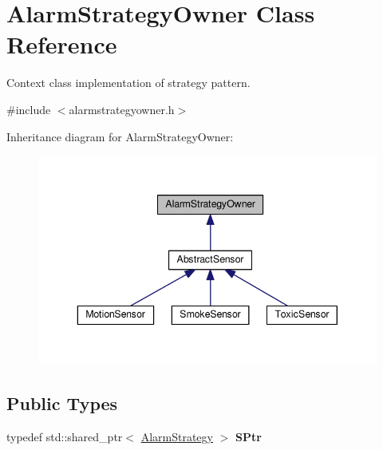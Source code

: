 \hypertarget{classAlarmStrategyOwner}{}\section{Alarm\+Strategy\+Owner Class Reference}
\label{classAlarmStrategyOwner}


Context class implementation of strategy pattern.  




{\ttfamily \#include $<$alarmstrategyowner.\+h$>$}



Inheritance diagram for Alarm\+Strategy\+Owner\+:\nopagebreak
\begin{figure}[H]
\begin{center}
\leavevmode
\includegraphics[width=343pt]{classAlarmStrategyOwner__inherit__graph}
\end{center}
\end{figure}
\subsection*{Public Types}
\begin{DoxyCompactItemize}
\item 
typedef std\+::shared\+\_\+ptr$<$ \hyperlink{classAlarmStrategy}{Alarm\+Strategy} $>$ {\bfseries S\+Ptr}\hypertarget{classAlarmStrategyOwner_aeebd31011e2a6d14a4492315ad15c5ee}{}\label{classAlarmStrategyOwner_aeebd31011e2a6d14a4492315ad15c5ee}

\end{DoxyCompactItemize}
